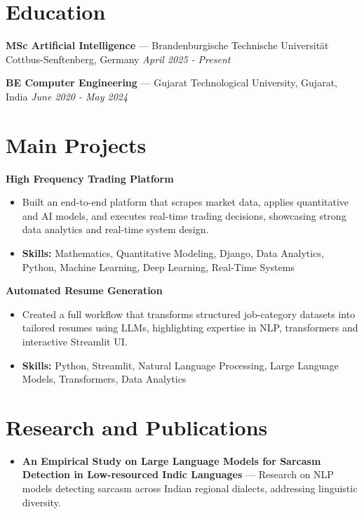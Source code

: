 \documentclass[a4paper,10pt]{article}
\begin{document}
\section*{Education}
\textbf{MSc Artificial Intelligence} — Brandenburgische Technische Universität Cottbus-Senftenberg, Germany \hfill \textit{April 2025 - Present}\par
\vspace{1.5pt}
\textbf{BE Computer Engineering} — Gujarat Technological University, Gujarat, India \hfill \textit{June 2020 - May 2024}\par

\section*{Main Projects}
\textbf{High Frequency Trading Platform}\par
\vspace{1pt}
\begin{itemize}
  \item Built an end-to-end platform that scrapes market data, applies quantitative and AI models, and executes real-time trading decisions, showcasing strong data analytics and real-time system design.
  \item \textbf{Skills:} Mathematics, Quantitative Modeling, Django, Data Analytics, Python, Machine Learning, Deep Learning, Real-Time Systems
\end{itemize}
\vspace{3pt}
\textbf{Automated Resume Generation}\par
\vspace{1pt}
\begin{itemize}
  \item Created a full workflow that transforms structured job-category datasets into tailored resumes using LLMs, highlighting expertise in NLP, transformers and interactive Streamlit UI.
  \item \textbf{Skills:} Python, Streamlit, Natural Language Processing, Large Language Models, Transformers, Data Analytics
\end{itemize}

\section*{Research and Publications}
\begin{itemize}
\item \textbf{An Empirical Study on Large Language Models for Sarcasm Detection in Low-resourced Indic Languages} — Research on NLP models detecting sarcasm across Indian regional dialects, addressing linguistic diversity.
\end{itemize}
\end{document}

